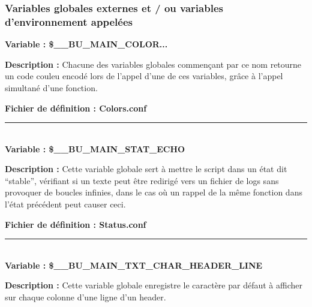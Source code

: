 \documentclass[a4paper,10pt]{article}
\begin{document}
\color{blue}
\subsubsection{Variables globales externes et / ou variables d'environnement appelées}\color{white}

\textbf{Variable : \color{orange}\$\_\_BU\_MAIN\_COLOR...}\\[1\baselineskip]

\begin{justify}
    \textbf{Description :} Chacune des variables globales commençant par ce nom retourne un code couleu encodé lors de l'appel d'une de ces variables, grâce à l'appel simultané d'une fonction.
\end{justify}

\textbf{Fichier de définition : \color{lime}Colors.conf}\\[1\baselineskip]



\color{orange}\par\noindent\rule{\textwidth}{0.4pt}\color{white}\\[1\baselineskip]

\textbf{Variable : \color{orange}\$\_\_BU\_MAIN\_STAT\_ECHO}\\[1\baselineskip]

\begin{justify}
    \textbf{Description :} Cette variable globale sert à mettre le script dans un état dit ``stable'', vérifiant si un texte peut être redirigé vers un fichier de logs sans provoquer de boucles infinies, dans le cas où un rappel de la même fonction dans l'état précédent peut causer ceci.
\end{justify}

\textbf{Fichier de définition : \color{lime}Status.conf}\\[1\baselineskip]



\color{orange}\par\noindent\rule{\textwidth}{0.4pt}\color{white}\\[1\baselineskip]

\textbf{Variable : \color{orange}\$\_\_BU\_MAIN\_TXT\_CHAR\_HEADER\_LINE}\\[1\baselineskip]

\begin{justify}
    \textbf{Description :} Cette variable globale enregistre le caractère par défaut à afficher sur chaque colonne d'une ligne d'un header.
\end{justify}
\end{document}
